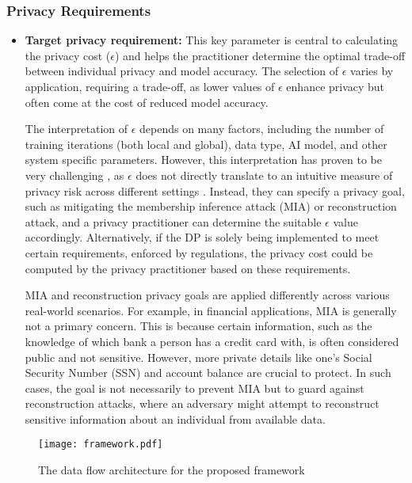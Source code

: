 \subsubsection{Privacy Requirements}
\begin{itemize}
\item \textbf{Target privacy requirement:} This key parameter is central to calculating the privacy cost ($\epsilon$) and helps the practitioner determine the optimal trade-off between individual privacy and model accuracy. The selection of \(\epsilon\) varies by application, requiring a trade-off, as lower values of \(\epsilon\) enhance privacy but often come at the cost of reduced model accuracy. 

The interpretation of $\epsilon$ depends on many factors, including the number of training iterations (both local and global), data type, AI model, and other system specific parameters. However, this interpretation has proven to be very challenging \cite{pmlr-v119-triastcyn20a}, as $\epsilon$ does not directly translate to an intuitive measure of privacy risk across different settings . Instead, they can specify a privacy goal, such as mitigating the membership inference attack (MIA) or reconstruction attack, and a privacy practitioner can determine the suitable \(\epsilon\) value accordingly. 
Alternatively, if the DP is solely being implemented to meet certain requirements, enforced by regulations, the privacy cost could be computed by the privacy practitioner based on these requirements. 

MIA and reconstruction privacy goals are applied differently across various real-world scenarios. For example, in financial applications, MIA is generally not a primary concern. This is because certain information, such as the knowledge of which bank a person has a credit card with, is often considered public and not sensitive. However, more private details like one's Social Security Number (SSN) and account balance are crucial to protect. In such cases, the goal is not necessarily to prevent MIA but to guard against reconstruction attacks, where an adversary might attempt to reconstruct sensitive information about an individual from available data.
\end{itemize}
\begin{figure}[t]
    \centering
    \texttt{[image: framework.pdf]}
    \caption{The data flow architecture for the proposed framework}
    \label{fig:flip}
\end{figure}
